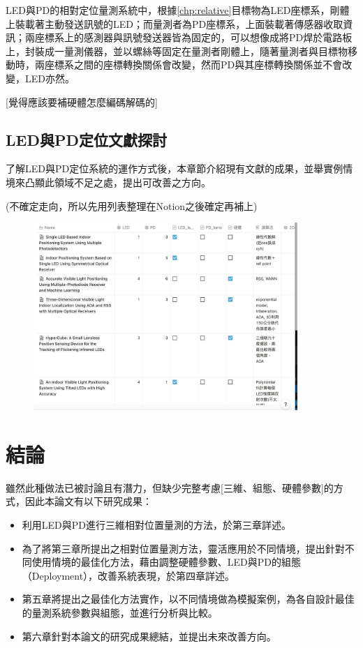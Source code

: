         LED與PD的相對定位量測系統中，根據\ref{chp:relative}目標物為LED座標系，剛體上裝載著主動發送訊號的LED；而量測者為PD座標系，上面裝載著傳感器收取資訊；兩座標系上的感測器與訊號發送器皆為固定的，可以想像成將PD焊於電路板上，封裝成一量測儀器，並以螺絲等固定在量測者剛體上，隨著量測者與目標物移動時，兩座標系之間的座標轉換關係會改變，然而PD與其座標轉換關係並不會改變，LED亦然。

        [覺得應該要補硬體怎麼編碼解碼的]



    \subsection{LED與PD定位文獻探討}

        了解LED與PD定位系統的運作方式後，本章節介紹現有文獻的成果，並舉實例情境來凸顯此領域不足之處，提出可改善之方向。
        
        (不確定走向，所以先用列表整理在Notion之後確定再補上)

        \begin{figure}[ht]
            \centering
            \includegraphics[width=10cm]{00temppic/temp.png}
        \end{figure}



\section{結論}

雖然此種做法已被討論且有潛力，但缺少完整考慮[三維、組態、硬體參數]的方式，因此本論文有以下研究成果：
\begin{itemize}
    \item 利用LED與PD進行三維相對位置量測的方法，於第三章詳述。
    \item 為了將第三章所提出之相對位置量測方法，靈活應用於不同情境，提出針對不同使用情境的最佳化方法，藉由調整硬體參數、LED與PD的組態（Deployment），改善系統表現，於第四章詳述。
    \item 第五章將提出之最佳化方法實作，以不同情境做為模擬案例，為各自設計最佳的量測系統參數與組態，並進行分析與比較。
    \item 第六章針對本論文的研究成果總結，並提出未來改善方向。
\end{itemize}